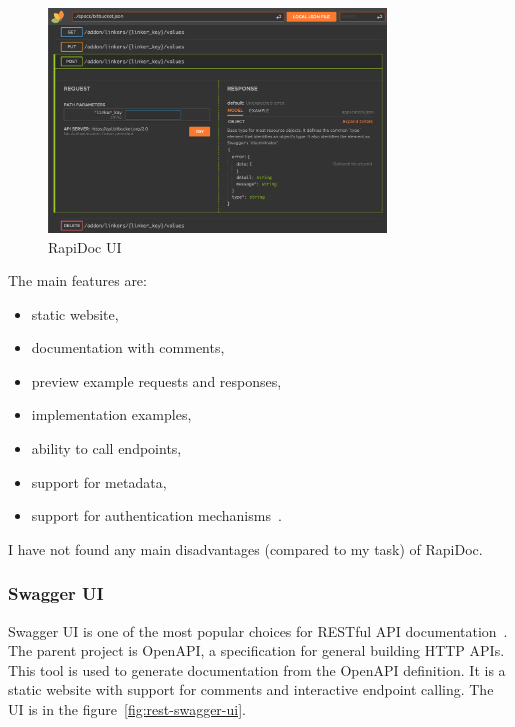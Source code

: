 \begin{figure}[hbt!]
    \centering
    \captionsetup{justification=centering}
    \includegraphics[width=0.8\textwidth]{images/rest/rapidoc}
    \caption{RapiDoc UI~\cite{rest-rapidoc}}
    \label{fig:rest-rapidoc}
\end{figure}

The main features are:
\begin{itemize}
    \item static website,
    \item documentation with comments,
    \item preview example requests and responses,
    \item implementation examples,
    \item ability to call endpoints,
    \item support for metadata,
    \item support for authentication mechanisms~\cite{rest-rapidoc}.
\end{itemize}

I have not found any main disadvantages (compared to my task) of RapiDoc.

\subsubsection{Swagger UI}
Swagger UI is one of the most popular choices for RESTful API documentation~\cite{rest-swagger-ui-popularity}.
The parent project is OpenAPI, a specification for general building HTTP APIs.
This tool is used to generate documentation from the OpenAPI definition.
It is a static website with support for comments and interactive endpoint calling.
The UI is in the figure~\ref{fig:rest-swagger-ui}.
\cite{rest-swagger-ui}

